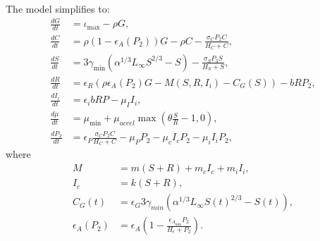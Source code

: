 \documentclass[11pt,reqno,final,pdftex]{amsart}\usepackage[]{graphicx}\usepackage[]{color}
\theoremstyle{plain}
\numberwithin{equation}{part}
\begin{document}
The model simplifies to:
\begin{align}
\frac{dG}{dt} &= \iota_{\max} - \rho G, \\
\frac{dC}{dt} &= \rho (1-\epsilon_A(P_2))G - \rho C - \frac{\sigma_C P_2 C}{H_C + C}, \\
\frac{dS}{dt} &= 3\gamma_{\min} \left(\alpha^{1/3}L_{\infty }S^{2/3}-S\right) - \frac{\sigma_S P_3 S}{H_S + S}, \\
\frac{dR}{dt} &= \epsilon_R\left(\rho \epsilon_A(P_2) G-M(S,R,I_i)-C_G(S)\right)-b R P_2, \\
\frac{dI_i}{dt} &= \epsilon_ib R P-\mu_II_i, \\
\frac{d\mu}{dt} &= \mu_{\min} + \mu_{accel}\max\left(\theta \frac{S}{R} - 1, 0\right), \\
\frac{dP_2}{dt} &= \epsilon_P \frac{\sigma_C P_2 C}{H_C + C} - \mu_P P_2 - \mu_c I_c P_2 - \mu_i I_i P_2,
\end{align}
where
\begin{align}
M &= m(S+R)+m_cI_c+m_iI_i, \\
I_c &= k(S + R), \\
C_G(t)&=\epsilon_G 3 \gamma_{min}\left(\alpha^{1/3}L_{\infty }S(t)^{2/3}-S(t)\right), \\
\epsilon_A(P_2) &= \epsilon_A\left(1 - \frac{\epsilon_{A_{\min}} P_2}{H_\epsilon + P_2}\right).
\end{align}
\end{document}
